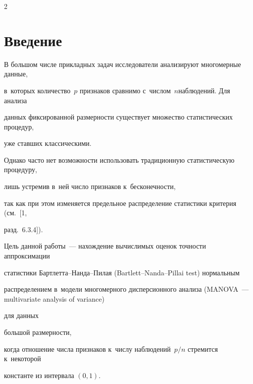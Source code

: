 \begin{multicols}{2}





\label{st\stat}














\section{Введение}


\label{sec:intro}





В большом числе прикладных задач исследователи анализируют многомерные данные, 


в~которых количество~$p$ признаков сравнимо с~числом~$n$\linebreak наблюдений. Для анализа 


данных фиксированной размерности существует множество статистических процедур, 


уже ставших классическими.\linebreak


Однако час\-то нет возможности использовать традиционную статистическую процедуру, 


лишь устремив в~ней чис\-ло признаков к~бесконечности,


так как при этом изменяется предельное распределение статистики критерия  (см.~[1,  


разд.~6.3.4]).





Цель данной работы~--- нахождение вычислимых оценок точности аппроксимации 


статистики Барт\-лет\-та--Нан\-да--Пи\-лая (Bartlett--Nanda--Pillai test) нормальным 


распределением в~модели многомерного дисперсионного анализа (MANOVA~--- multivariate analysis of variance) 


для данных 


большой размерности,


когда отношение числа \mbox{признаков} к~чис\-лу  наблюдений~$p/n$ стремится к~некоторой 


константе из интервала $(0, 1)$.






\end{multicols}
